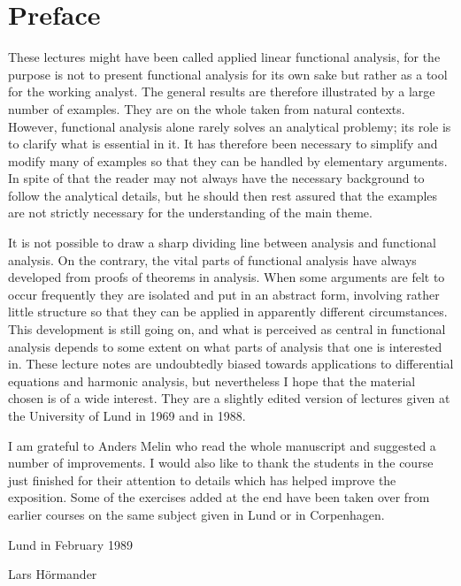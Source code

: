 \indentafterchapter
\chapter{Preface}
These lectures might have been called applied linear functional
analysis, for the purpose is not to present functional analysis for
its own sake but rather as a tool for the working analyst. The general
results are therefore illustrated by a large number of examples. They
are on the whole taken from natural contexts. However, functional
analysis alone rarely solves an analytical problemy; its role is to
clarify what is essential in it. It has therefore been necessary to
simplify and modify many of examples so that they can be handled by
elementary arguments. In spite of that the reader may not always have
the necessary background to follow the analytical details, but he
should then rest assured that the examples are not strictly necessary
for the understanding of the main theme.\par
It is not possible to draw a sharp dividing line between analysis and
functional analysis. On the contrary, the vital parts of functional
analysis have always developed from proofs of theorems in
analysis. When some arguments are felt to occur frequently they are
isolated and put in an abstract form, involving rather little
structure so that they can be applied in apparently different
circumstances. This development is still going on, and what is
perceived as central in functional analysis depends to some extent on
what parts of analysis that one is interested in. These lecture notes
are undoubtedly biased towards applications to differential equations
and harmonic analysis, but nevertheless I hope that the material
chosen is of a wide interest. They are a slightly edited version of
lectures given at the University of Lund in 1969 and in 1988.\par
I am grateful to Anders Melin who read the whole manuscript and
suggested a number of improvements. I would also like to thank the
students in the course just finished for their attention to details
which has helped improve the exposition. Some of the exercises added
at the end have been taken over from earlier courses on the same
subject given in Lund or in Corpenhagen.
\vspace*{3em}
\begin{flushright}
  \parbox{5cm}{Lund in February 1989\\\rule{0pt}{5em}Lars
    H\"ormander\hfill}
\end{flushright}

